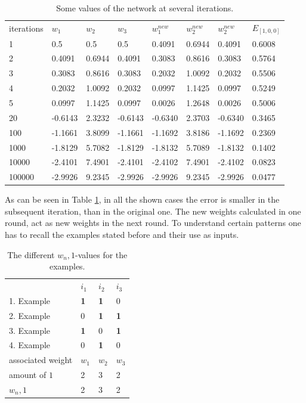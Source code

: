 \documentclass[12pt]{article}
\begin{document}
\begin{table}[H]
\begin{tabular}{llllllll}
iterations & $w_1$      & $w_2$     & $w_3$     & $w_{1}^{new}$   &  $w_{2}^{new}$  &  $w_{2}^{new}$   & $E_{[1,0,0]}$     \\
1          & 0.5     & 0.5    & 0.5     & 0.4091  & 0.6944 & 0.4091  & 0.6008 \\
2          & 0.4091  & 0.6944 & 0.4091  & 0.3083  & 0.8616 & 0.3083  & 0.5764 \\
3          & 0.3083  & 0.8616 & 0.3083  & 0.2032  & 1.0092 & 0.2032  & 0.5506 \\
4          & 0.2032  & 1.0092 & 0.2032  & 0.0997  & 1.1425 & 0.0997  & 0.5249 \\
5          & 0.0997  & 1.1425 & 0.0997  & 0.0026  & 1.2648 & 0.0026  & 0.5006 \\
20         & -0.6143 & 2.3232 & -0.6143 & -0.6340 & 2.3703 & -0.6340 & 0.3465 \\
100        & -1.1661 & 3.8099 & -1.1661 & -1.1692 & 3.8186 & -1.1692 & 0.2369 \\
1000       & -1.8129 & 5.7082 & -1.8129 & -1.8132 & 5.7089 & -1.8132 & 0.1402 \\
10000      & -2.4101 & 7.4901 & -2.4101 & -2.4102 & 7.4901 & -2.4102 & 0.0823 \\
100000     & -2.9926  & 9.2345 & -2.9926  & -2.9926 & 9.2345 & -2.9926 & 0.0477

\end{tabular}
\caption{Some values of the network at several iterations.}
\label{table}
\end{table}

As can be seen in Table \ref{table}, in all the shown cases the error is smaller in the subsequent \gls{iteration}, than in the original one. The new weights calculated in one round, act as new weights in the next round. To understand certain patterns one has to recall the examples stated before and their use as inputs.
\begin{table}
\begin{tabular}{llll}
                  & $i_1$       & $i_2$       & $i_3$       \\
1. Example        & \textbf{1} & \textbf{1} & 0          \\
2. Example        & 0          & \textbf{1} & \textbf{1} \\
3. Example        & \textbf{1} & 0          & \textbf{1} \\
4. Example        & 0          & \textbf{1} & 0          \\ \hline
associated weight & $w_1$       & $w_2$       & $w_3$       \\
amount of $1$     & 2          & 3          & 2          \\
$w_n,1$            & 2          & 3          & 2         
\end{tabular}
\caption{The different $w_n,1$-values for the examples.}
\label{tablewn}
\end{table}
\end{document}
